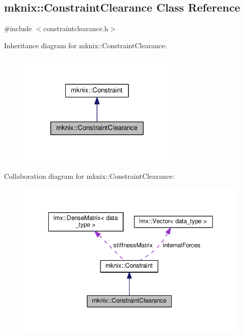 \hypertarget{classmknix_1_1_constraint_clearance}{}\subsection{mknix\+:\+:Constraint\+Clearance Class Reference}
\label{classmknix_1_1_constraint_clearance}


{\ttfamily \#include $<$constraintclearance.\+h$>$}



Inheritance diagram for mknix\+:\+:Constraint\+Clearance\+:\nopagebreak
\begin{figure}[H]
\begin{center}
\leavevmode
\includegraphics[width=218pt]{df/d57/classmknix_1_1_constraint_clearance__inherit__graph}
\end{center}
\end{figure}


Collaboration diagram for mknix\+:\+:Constraint\+Clearance\+:\nopagebreak
\begin{figure}[H]
\begin{center}
\leavevmode
\includegraphics[width=348pt]{de/d1a/classmknix_1_1_constraint_clearance__coll__graph}
\end{center}
\end{figure}
